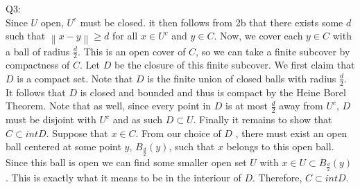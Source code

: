 \documentclass[letterpaper]{article}
\newcommand{\norm}[1]{\left\lVert#1\right\rVert}
\begin{document}
Q3:\\
Since $U$ open, $U^c$ must be closed. it then follows from 2b that there exists some $d$ such that $\norm{x-y} \geq d$ for all $x \in U^c$ and $y \in C$. Now, we cover each $y\in C$ with a ball of radius $\frac{d}{2}$. 
This is an open cover of $C$, so we can take a finite subcover by compactness of $C$. Let $D$ be the closure of this finite subcover. We first claim that $D$ is a compact set. Note that $D$ is the finite union of closed balls with radius $\frac{d}{2}$. It follows that $D$ is closed and bounded and thus is compact by the Heine Borel Theorem. Note that as well, since every point in $D$ is at most $\frac{d}{2}$ away from $U^c$, $D$ must be disjoint with $U^c$ and as such $D \subset U$. 
Finally it remains to show that $C \subset int D$. Suppose that $x\in C$. From our choice of $D$ , there must exist an open ball centered at some point $y$, $B_{\frac{d}{2}}(y)$, such that $x$ belongs to this open ball. Since this ball is open we can find some smaller open set $U$ with $x\in U \subset B_{\frac{d}{2}}(y)$. This is exactly what it means to be in the interiour of $D$. Therefore, $C \subset int D$. 
\end{document}
